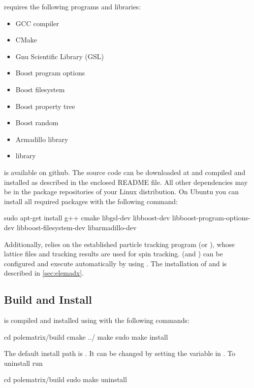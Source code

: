 \documentclass[a4paper]{scrartcl}
\begin{document}
\polem requires the following programs and libraries:
\begin{itemize}
\item GCC compiler
\item CMake
\item Gnu Scientific Library (GSL) \cite{gsl}
\item Boost program options
\item Boost filesystem
\item Boost property tree \cite{boost-pt}
\item Boost random \cite{boost-random}
\item Armadillo library \cite{arma}
\item \pal library \cite{palattice}
\end{itemize}
\pal is available on github. The source code can be downloaded at \cite{palattice} and
compiled and installed as described in the enclosed README file.
%
All other dependencies may be in the package repositories of your Linux distribution. On
Ubuntu you can install all required packages with the following command:
\begin{bashcode}
  sudo apt-get install g++ cmake libgsl-dev libboost-dev libboost-program-options-dev libboost-filesystem-dev libarmadillo-dev
\end{bashcode}
Additionally, \polem relies on the established particle
tracking program \ele (or \madx), whose lattice files and tracking results are used for
spin tracking.  \ele (and \madx) can be configured and execute automatically by \polem using
\pal. The installation of \ele and \madx is described in \cref{sec:elemadx}.


    
\subsection{Build and Install \polem}
\label{sec:build}
\polem is compiled and installed using  with the following commands:
\begin{bashcode}
  cd polematrix/build
  cmake ../
  make
  sudo make install
\end{bashcode}
The default install path is . It can be changed by setting the
 variable in .
%
To uninstall \polem run
\begin{bashcode}
  cd polematrix/build
  sudo make uninstall
\end{bashcode}
\end{document}
